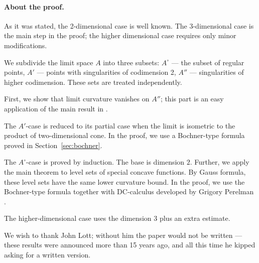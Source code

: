 \paragraph{About the proof.}
As it was stated, the 2-dimensional case is well known.
The 3-dimensional case is the main step in the proof;
the higher dimensional case requires only minor modifications.

We subdivide the limit space $A$ into
three subsets: $A^\circ$ --- the subset of regular 
points, $A'$ --- points with singularities of codimension 2,
$A''$ --- singularities of higher codimension.
These sets are treated independently.

First, we show that limit curvature vanishes on $A''$; 
this part is an easy application of the main result in \cite{petrunin-SC}.

The $A'$-case is reduced to its partial case when the limit is isometric to the product of two-dimensional cone.
In the proof, we use a Bochner-type formula proved in Section~\ref{sec:bochner}.

The $A^\circ$-case is proved by induction.
The base is dimension $2$.
Further, we apply the main theorem to level sets of special concave functions.
By Gauss formula, these level sets have the same lower curvature bound. 
In the proof, we use the Bochner-type formula together with DC-calculus developed by Grigory Perelman \cite{PerDC}.

The higher-dimensional case uses the dimension 3 plus an extra estimate.

We wish to thank John Lott; without him the paper would not be written ---
these results were announced more than 15 years ago, and all this time he kipped asking for a written version.
